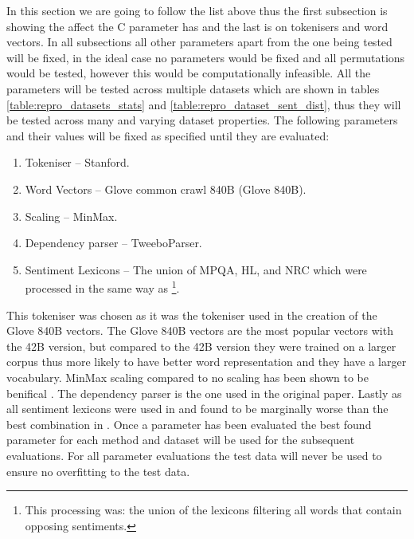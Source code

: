 In this section we are going to follow the list above thus the first subsection is showing the affect the C parameter has and the last is on tokenisers and word vectors. In all subsections all other parameters apart from the one being tested will be fixed, in the ideal case no parameters would be fixed and all permutations would be tested, however this would be computationally infeasible. All the parameters will be tested across multiple datasets which are shown in tables \ref{table:repro_datasets_stats} and \ref{table:repro_dataset_sent_dist}, thus they will be tested across many and varying dataset properties. The following parameters and their values will be fixed as specified until they are evaluated:
\begin{enumerate}
    \item Tokeniser -- Stanford. 
    \item Word Vectors -- Glove common crawl 840B (Glove 840B).
    \item Scaling -- MinMax.
    \item Dependency parser -- TweeboParser.
    \item Sentiment Lexicons -- The union of MPQA, HL, and NRC which were processed in the same way as \citet{vo2015target}\footnote{This processing was: the union of the lexicons filtering all words that contain opposing sentiments.}.
\end{enumerate}
This tokeniser was chosen as it was the tokeniser used in the creation of the Glove 840B vectors. The Glove 840B vectors are the most popular vectors with the 42B version, but compared to the 42B version they were trained on a larger corpus thus more likely to have better word representation and they have a larger vocabulary. MinMax scaling compared to no scaling has been shown to be benifical \citep{moore-rayson-2018-bringing}. The dependency parser is the one used in the original paper. Lastly as all sentiment lexicons were used in \citet{wang-etal-2017-tdparse} and found to be marginally worse than the best combination in \citet{vo2015target}. Once a parameter has been evaluated the best found parameter for each method and dataset will be used for the subsequent evaluations. For all parameter evaluations the test data will never be used to ensure no overfitting to the test data. 

